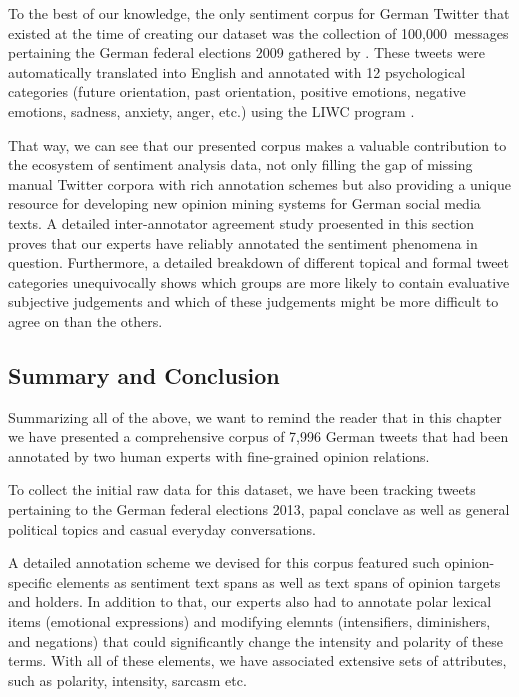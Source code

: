 To the best of our knowledge, the only sentiment corpus for German
Twitter that existed at the time of creating our dataset was the
collection of 100,000~messages pertaining the German federal elections
2009 gathered by \citet{Tumasjan:10}.  These tweets were automatically
translated into English and annotated with 12 psychological categories
(future orientation, past orientation, positive emotions, negative
emotions, sadness, anxiety, anger, etc.) using the LIWC program
\cite[Linguistic Inquiry and Word Count;][]{Pannebaker:07}.

That way, we can see that our presented corpus makes a valuable
contribution to the ecosystem of sentiment analysis data, not only
filling the gap of missing manual Twitter corpora with rich annotation
schemes but also providing a unique resource for developing new
opinion mining systems for German social media texts.  A detailed
inter-annotator agreement study proesented in this section proves that
our experts have reliably annotated the sentiment phenomena in
question.  Furthermore, a detailed breakdown of different topical and
formal tweet categories unequivocally shows which groups are more
likely to contain evaluative subjective judgements and which of these
judgements might be more difficult to agree on than the others.

\subsection{Summary and Conclusion}
Summarizing all of the above, we want to remind the reader that in
this chapter we have presented a comprehensive corpus of 7,996 German
tweets that had been annotated by two human experts with fine-grained
opinion relations.

To collect the initial raw data for this dataset, we have been
tracking tweets pertaining to the German federal elections 2013, papal
conclave as well as general political topics and casual everyday
conversations.

A detailed annotation scheme we devised for this corpus featured such
opinion-specific elements as sentiment text spans as well as text
spans of opinion targets and holders.  In addition to that, our
experts also had to annotate polar lexical items (emotional
expressions) and modifying elemnts (intensifiers, diminishers, and
negations) that could significantly change the intensity and polarity
of these terms.  With all of these elements, we have associated
extensive sets of attributes, such as polarity, intensity, sarcasm
etc.

